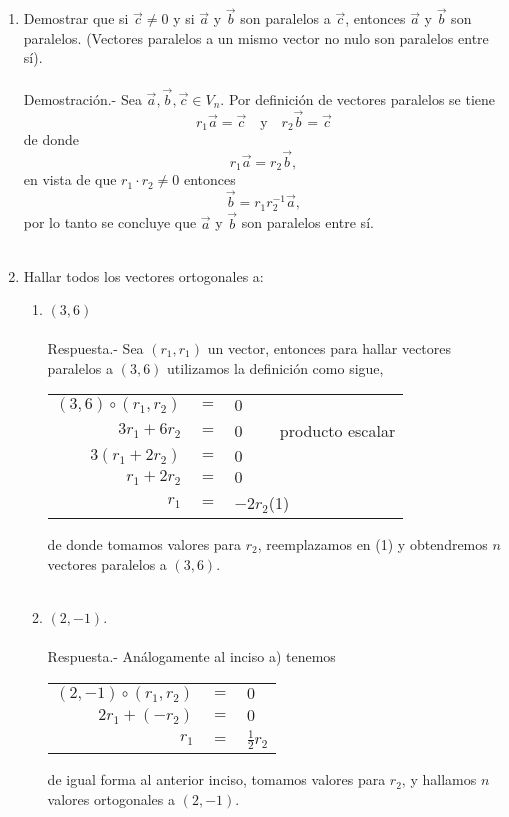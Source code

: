 \begin{enumerate}
\begin{enumerate}[\bfseries a)]
\end{enumerate}

\item Demostrar que si $\vec{c}\neq 0$ y si $\vec{a}$ y $\vec{b}$ son paralelos a $\vec{c}$, entonces $\vec{a}$ y $\vec{b}$ son paralelos. (Vectores paralelos a un mismo vector no nulo son paralelos entre sí).\\\\
    Demostración.-\; Sea $\vec{a},\vec{b},\vec{c}\in V_n$. Por definición de vectores paralelos se tiene $$r_1\vec{a}=\vec{c}\quad \mbox{y} \quad r_2\vec{b}=\vec{c}$$ de donde $$r_1\vec{a}=r_2\vec{b},$$ en vista de que $r_1\cdot r_2 \neq 0$ entonces $$\vec{b}=r_1r_2^{-1} \vec{a},$$ por lo tanto se concluye que $\vec{a}$ y $\vec{b}$ son paralelos entre sí.\\\\

\item Hallar todos los vectores ortogonales a:
\begin{enumerate}[\bfseries a)]
    
    \item $(3,6)$\\\\
	Respuesta.-\; Sea $(r_1,r_1)$ un vector, entonces para hallar vectores paralelos a $(3,6)$ utilizamos la definición como sigue,
	\begin{center}	
	    \begin{tabular}{rcl}
		$(3,6)\circ (r_1,r_2)$&$=$&$0$\\
		$3r_1+6r_2$&$=$&$0 \qquad$ producto escalar\\
		$3(r_1+2r_2)$&$=$&$0$\\
		$r_1+2r_2$&$=$&$0$\\
		$r_1$&$=$&$-2r_2$\qquad (1)\\
	    \end{tabular}
	\end{center}
	de donde tomamos valores para $r_2$, reemplazamos en (1) y obtendremos $n$ vectores paralelos a $(3,6)$.\\\\

    \item $(2,-1)$.\\\\
	Respuesta.-\; Análogamente al inciso a) tenemos 
	\begin{center}
	\begin{tabular}{rcl}
	    $(2,-1)\circ (r_1,r_2)$&$=$&$0$\\
	    $2r_1 + (-r_2)$&$=$&$0$\\
	    $r_1$&$=$&$\frac{1}{2}r_2$\\
	\end{tabular}
	\end{center}
	de igual forma al anterior inciso, tomamos valores para $r_2$, y hallamos $n$ valores ortogonales a $(2,-1)$.\\\\


\end{enumerate}
\end{enumerate}
